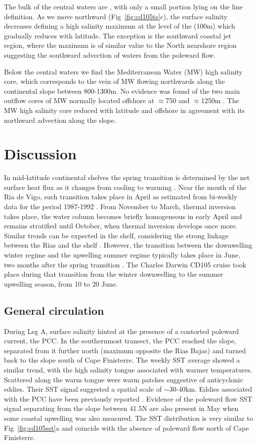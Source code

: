 The bulk of the central waters are \enawt, with only a small
portion lying on the \enawp line definition. As we move northward
(Fig~\ref{fig:cd105ts}c), the surface salinity decreases defining
a high salinity maximum at the level of the \enawt (100m) which
gradually reduces with latitude. The exception is the southward
coastal jet region, where the maximum is of similar value to the
North nearshore region suggesting the southward advection of
waters from the poleward flow.

Below the central waters we find the Mediterranean Water (MW) high
salinity core, which corresponds to the vein of MW flowing
northwards along the continental slope between 800-1300m. No
evidence was found of the two main outflow cores of MW normally
located offshore at $\approx$750 and $\approx$1250m
\citep{Zenk90}. The MW high salinity core reduced with latitude
and offshore in agreement with its northward advection along the
slope.

\section{Discussion}
In mid-latitude continental shelves the spring transition is
determined by the net surface heat flux as it changes from cooling
to warming \cite{He02}. Near the mouth of the Ria de Vigo, such
transition takes place in April as estimated from bi-weekly data
for the period 1987-1992 \citep{Nogueira97}. From November to
March, thermal inversion takes place, the water column becomes
briefly homogeneous in early April and remains stratified until
October, when thermal inversion develops once more. Similar trends
can be expected in the shelf, considering the strong linkage
between the Rias and the shelf \citep{Alvarez-Salgado00}. However,
the transition between the downwelling winter regime and the
upwelling summer regime typically takes place in June, two months
after the spring transition \citep{Nykjaer94}. The Charles Darwin
CD105 cruise took place during that transition from the winter
downwelling to the summer upwelling season, from 10 to 20 June.

\subsection{General circulation}
During Leg A, surface salinity hinted at the presence of a
contorted poleward current, the PCC. In the southernmost transect,
the PCC reached the slope, separated from it further north
(maximum opposite the Rias Bajas) and turned back to the slope
south of Cape Finisterre. The weekly SST average showed a similar
trend, with the high salinity tongue associated with warmer
temperatures. Scattered along the warm tongue were warm patches
suggestive of anticyclonic eddies. Their SST signal suggested a
spatial scale of $\sim$30-40km. Eddies associated with the PCC
have been previously reported \citep{Haynes91,Sena96}. Evidence of
the poleward flow SST signal separating from the slope between
41.5\deg N are also present in May when some coastal
upwelling was also measured. The SST distribution is very similar
to Fig~\ref{fig:cd105sst}a and coincide with the absence of
poleward flow north of Cape Finisterre.

